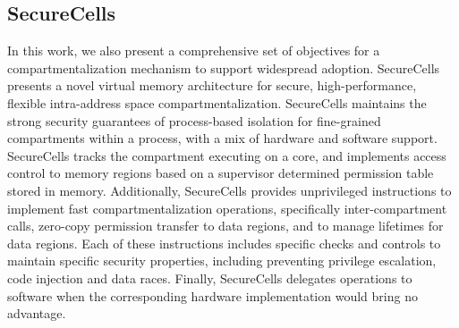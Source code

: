 \subsection{SecureCells}
In this work, we also present a comprehensive set of objectives for a 
compartmentalization mechanism to support widespread adoption.
SecureCells presents a novel virtual memory architecture for secure, 
high-performance, flexible intra-address space compartmentalization.
SecureCells maintains the strong security guarantees of process-based isolation
for fine-grained compartments within a process, with a mix of hardware and
software support.
SecureCells tracks the compartment executing on a core, and implements access
control to memory regions based on a supervisor determined permission table
stored in memory.
Additionally, SecureCells provides unprivileged instructions to implement
fast compartmentalization operations, specifically inter-compartment calls,
zero-copy permission transfer to data regions, and to manage lifetimes for
data regions.
Each of these instructions includes specific checks and controls to maintain
specific security properties, including preventing privilege escalation,
code injection and data races.
Finally, SecureCells delegates operations to software when the corresponding
hardware implementation would bring no advantage.


